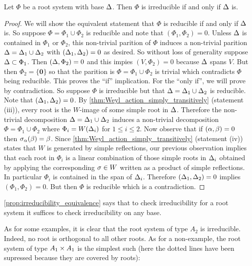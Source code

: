 \documentclass[12pt,reqno,oneside]{amsart}
\begin{document}
    \begin{proposition}\label{prop:irreducibility_equivalence}
        Let $\Phi$ be a root system with base $\Delta$. Then $\Phi$ is irreducible if and only if $\Delta$ is.
    \end{proposition}
    \begin{proof}
        We will show the equivalent statement that $\Phi$ is reducible if and only if $\Delta$ is. So suppose $\Phi = \Phi_{1} \cup \Phi_{2}$ is reducible and note that $(\Phi_{1},\Phi_{2}) = 0$. Unless $\Delta$ is contained in $\Phi_{1}$ or $\Phi_{2}$, this non-trivial parition of $\Phi$ induces a non-trivial parition $\Delta = \Delta_{1} \cup \Delta_{2}$ with $(\Delta_{1},\Delta_{2}) = 0$ as desired. So without loss of generality suppose $\Delta \subset \Phi_{1}$. Then $(\Delta,\Phi_{2}) = 0$ and this impies $(V,\Phi_{2}) = 0$ because $\Delta$ spans $V$. But then $\Phi_{2} = \{\textbf{0}\}$ so that the parition is $\Phi = \Phi_{1} \cup \Phi_{2}$ is trivial which contradicts $\Phi$ being reducible. This proves the ``if'' implication. For the ``only if'', we will prove by contradiction. So suppose $\Phi$ is irreducible but that $\Delta = \Delta_{1} \cup \Delta_{2}$ is reducible. Note that $(\Delta_{1},\Delta_{2}) = 0$. By \cref{thm:Weyl_action_simply_transitively} (statement (iii)), every root is the $W$-image of some simple root in $\Delta$. Therefore the non-trivial decomposition $\Delta = \Delta_{1} \cup \Delta_{2}$ induces a non-trivial decomposition $\Phi = \Phi_{1} \cup \Phi_{2}$ where $\Phi_{i} = W(\Delta_{i})$ for $1 \le i \le 2$. Now observe that if $(\alpha,\beta) = 0$ then $\sigma_{\alpha}(\beta) = \beta$. Since \cref{thm:Weyl_action_simply_transitively} (statement (iv)) states that $W$ is generated by simple reflections, our previous observation implies that each root in $\Phi_{i}$ is a linear combination of those simple roots in $\Delta_{i}$ obtained by applying the corresponding $\sigma \in W$ written as a product of simple reflections. In particular $\Phi_{i}$ is contained in the span of $\Delta_{i}$. Therefore $(\Delta_{1},\Delta_{2}) = 0$ implies $(\Phi_{1},\Phi_{2}) = 0$. But then $\Phi$ is reducible which is a contradiction.
    \end{proof}

    \cref{prop:irreducibility_equivalence} says that to check irreducibility for a root system it suffices to check irreducibility on any base.

    As for some examples, it is clear that the root system of type $A_{2}$ is irreducible. Indeed, no root is orthogonal to all other roots. As for a non-example, the root system of type $A_{1} \times A_{1}$ is the simplest such (here the dotted lines have been supressed because they are covered by roots):
\end{document}
